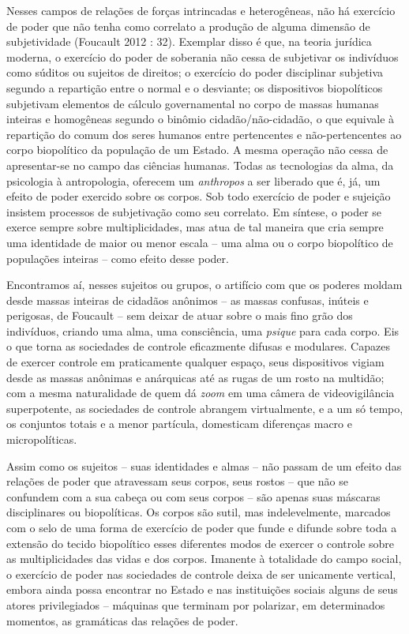 Nesses campos de relações de forças intrincadas e heterogêneas, não há
exercício de poder que não tenha como correlato a produção de alguma
dimensão de subjetividade (Foucault 2012 : 32). Exemplar disso é que, na
teoria jurídica moderna, o exercício do poder de soberania não cessa de
subjetivar os indivíduos como súditos ou sujeitos de direitos; o
exercício do poder disciplinar subjetiva segundo a repartição entre o
normal e o desviante; os dispositivos biopolíticos subjetivam elementos
de cálculo governamental no corpo de massas humanas inteiras e
homogêneas segundo o binômio cidadão/não-cidadão, o que equivale à
repartição do comum dos seres humanos entre pertencentes e
não-pertencentes ao corpo biopolítico da população de um Estado. A mesma
operação não cessa de apresentar-se no campo das ciências humanas. Todas
as tecnologias da alma, da psicologia à antropologia, oferecem um
\emph{anthropos} a ser liberado que é, já, um efeito de poder exercido
sobre os corpos. Sob todo exercício de poder e sujeição insistem
processos de subjetivação como seu correlato. Em síntese, o poder se
exerce sempre sobre multiplicidades, mas atua de tal maneira que cria
sempre uma identidade de maior ou menor escala -- uma alma ou o corpo
biopolítico de populações inteiras -- como efeito desse poder.

Encontramos aí, nesses sujeitos ou grupos, o artifício com que os
poderes moldam desde massas inteiras de cidadãos anônimos -- as massas
confusas, inúteis e perigosas, de Foucault -- sem deixar de atuar sobre
o mais fino grão dos indivíduos, criando uma alma, uma consciência, uma
\emph{psique} para cada corpo. Eis o que torna as sociedades de controle
eficazmente difusas e modulares. Capazes de exercer controle em
praticamente qualquer espaço, seus dispositivos vigiam desde as massas
anônimas e anárquicas até as rugas de um rosto na multidão; com a mesma
naturalidade de quem dá \emph{zoom} em uma câmera de videovigilância
superpotente, as sociedades de controle abrangem virtualmente, e a um só
tempo, os conjuntos totais e a menor partícula, domesticam diferenças
macro e micropolíticas.

Assim como os sujeitos -- suas identidades e almas -- não passam de um
efeito das relações de poder que atravessam seus corpos, seus rostos --
que não se confundem com a sua cabeça ou com seus corpos -- são apenas
suas máscaras disciplinares ou biopolíticas. Os corpos são sutil, mas
indelevelmente, marcados com o selo de uma forma de exercício de poder
que funde e difunde sobre toda a extensão do tecido biopolítico esses
diferentes modos de exercer o controle sobre as multiplicidades das
vidas e dos corpos. Imanente à totalidade do campo social, o exercício
de poder nas sociedades de controle deixa de ser unicamente vertical,
embora ainda possa encontrar no Estado e nas instituições sociais alguns
de seus atores privilegiados -- máquinas que terminam por polarizar, em
determinados momentos, as gramáticas das relações de poder.

